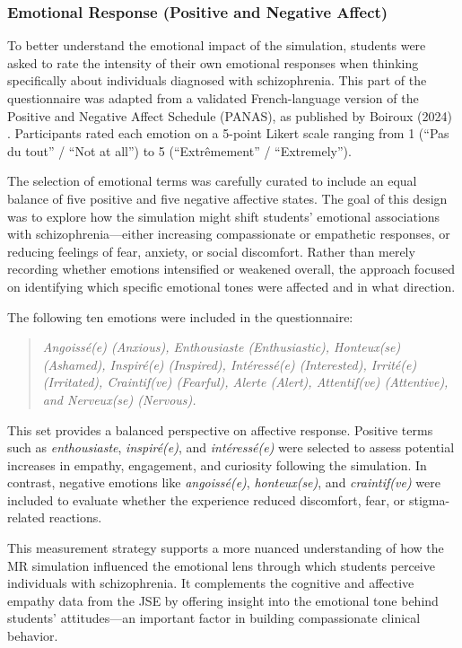 \subsubsection{Emotional Response (Positive and Negative Affect)}

To better understand the emotional impact of the simulation, students were asked to rate the intensity of their own emotional responses when thinking specifically about individuals diagnosed with schizophrenia. This part of the questionnaire was adapted from a validated French-language version of the Positive and Negative Affect Schedule (PANAS), as published by Boiroux (2024) \cite{Boiroux2024}. Participants rated each emotion on a 5-point Likert scale ranging from 1 (“Pas du tout” / “Not at all”) to 5 (“Extrêmement” / “Extremely”).

The selection of emotional terms was carefully curated to include an equal balance of five positive and five negative affective states. The goal of this design was to explore how the simulation might shift students’ emotional associations with schizophrenia—either increasing compassionate or empathetic responses, or reducing feelings of fear, anxiety, or social discomfort. Rather than merely recording whether emotions intensified or weakened overall, the approach focused on identifying which specific emotional tones were affected and in what direction.

The following ten emotions were included in the questionnaire:

\begin{quote}
\textit{Angoissé(e) (Anxious), Enthousiaste (Enthusiastic), Honteux(se) (Ashamed), Inspiré(e) (Inspired), Intéressé(e) (Interested), Irrité(e) (Irritated), Craintif(ve) (Fearful), Alerte (Alert), Attentif(ve) (Attentive), and Nerveux(se) (Nervous).}
\end{quote}

This set provides a balanced perspective on affective response. Positive terms such as \textit{enthousiaste}, \textit{inspiré(e)}, and \textit{intéressé(e)} were selected to assess potential increases in empathy, engagement, and curiosity following the simulation. In contrast, negative emotions like \textit{angoissé(e)}, \textit{honteux(se)}, and \textit{craintif(ve)} were included to evaluate whether the experience reduced discomfort, fear, or stigma-related reactions.

This measurement strategy supports a more nuanced understanding of how the MR simulation influenced the emotional lens through which students perceive individuals with schizophrenia. It complements the cognitive and affective empathy data from the JSE by offering insight into the emotional tone behind students’ attitudes—an important factor in building compassionate clinical behavior.


